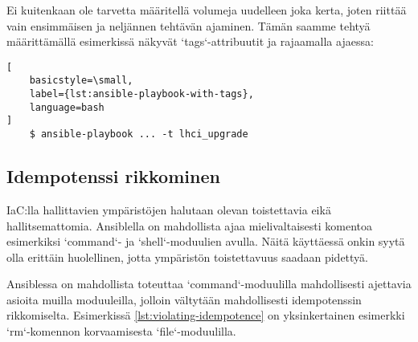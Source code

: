 

Ei kuitenkaan ole tarvetta määritellä volumeja uudelleen joka kerta, joten riittää vain
ensimmäisen ja neljännen tehtävän ajaminen. Tämän saamme tehtyä määrittämällä esimerkissä
näkyvät `tags`-attribuutit ja rajaamalla ajaessa:

\begin{lstlisting}[
    basicstyle=\small,
    label={lst:ansible-playbook-with-tags},
    language=bash
]
    $ ansible-playbook ... -t lhci_upgrade
\end{lstlisting}

\subsection{Idempotenssi rikkominen}

IaC:lla hallittavien ympäristöjen halutaan olevan toistettavia eikä hallitsemattomia.
Ansiblella on mahdollista ajaa mielivaltaisesti komentoa esimerkiksi `command`- ja
`shell`-moduulien avulla. Näitä käyttäessä onkin syytä olla erittäin huolellinen,
jotta ympäristön toistettavuus saadaan pidettyä. \parencite{KumaraIndika2021Tdad}

Ansiblessa on mahdollista toteuttaa `command`-moduulilla mahdollisesti ajettavia
asioita muilla moduuleilla, jolloin vältytään mahdollisesti idempotenssin rikkomiselta.
Esimerkissä \ref{lst:violating-idempotence} on yksinkertainen esimerkki `rm`-komennon
korvaamisesta `file`-moduulilla.


